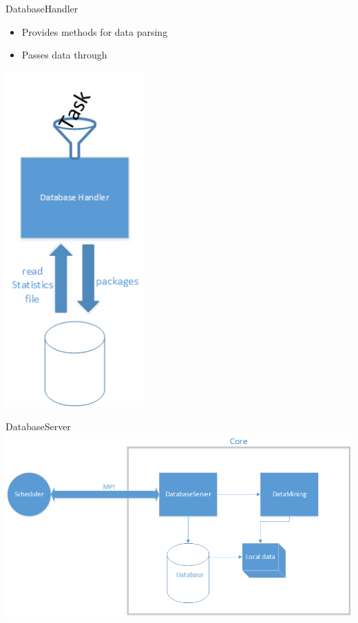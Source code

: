 	\begin{frame}{DatabaseHandler}
	
	\begin{minipage}[t]{0.5\textwidth}
	\begin{itemize}
		\item Provides methods for data parsing
		\item Passes data through
	\end{itemize}
	\end{minipage}
	
	\begin{minipage}[t]{0.5\textwidth}
	\includegraphics[width=0.4\textwidth]{images/zeichnunghandler.png}
	\end{minipage}
	
	\end{frame}
	
	\begin{frame}{DatabaseServer}
	\includegraphics[width=1.0\textwidth]{images/Zeichnung6.png}
	\end{frame}
	
